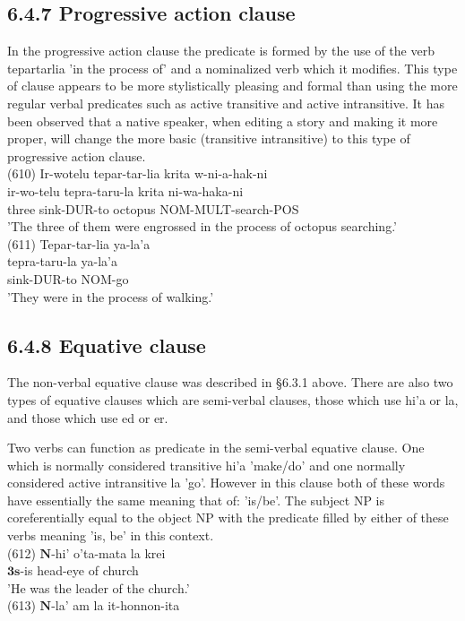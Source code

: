 \documentclass[10pt]{article}
\begin{document}
\subsection*{6.4.7 Progressive action clause}
In the progressive action clause the predicate is formed by the use of the verb tepartarlia 'in the process of' and a nominalized verb which it modifies. This type of clause appears to be more stylistically pleasing and formal than using the more regular verbal predicates such as active transitive and active intransitive. It has been observed that a native speaker, when editing a story and making it more proper, will change the more basic (transitive intransitive) to this type of progressive action clause.\\
(610) Ir-wotelu tepar-tar-lia krita w-ni-a-hak-ni\\
ir-wo-telu tepra-taru-la krita ni-wa-haka-ni\\
three sink-DUR-to octopus NOM-MULT-search-POS\\
'The three of them were engrossed in the process of octopus searching.'\\
(611) Tepar-tar-lia ya-la'a\\
tepra-taru-la ya-la'a\\
sink-DUR-to NOM-go\\
'They were in the process of walking.'

\subsection*{6.4.8 Equative clause}
The non-verbal equative clause was described in §6.3.1 above. There are also two types of equative clauses which are semi-verbal clauses, those which use hi'a or la, and those which use ed or er.

Two verbs can function as predicate in the semi-verbal equative clause. One which is normally considered transitive hi'a 'make/do' and one normally considered active intransitive la 'go'. However in this clause both of these words have essentially the same meaning that of: 'is/be'. The subject NP is coreferentially equal to the object NP with the predicate filled by either of these verbs meaning 'is, be' in this context.\\
(612) \(\boldsymbol{N}\)-hi' o'ta-mata la krei\\
\(\mathbf{3 s}\)-is head-eye of church\\
'He was the leader of the church.'\\
(613) \(\boldsymbol{N}\)-la' am la it-honnon-ita
\end{document}
